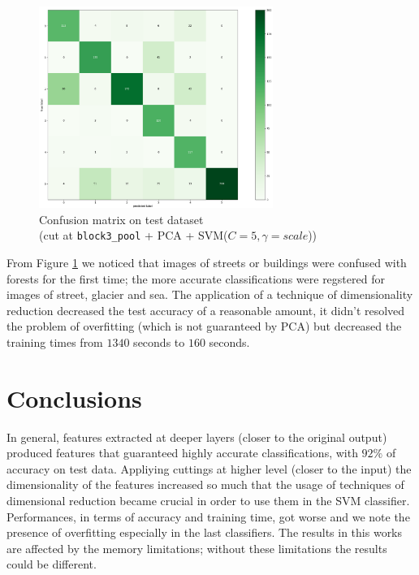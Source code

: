 \documentclass[compsoc]{IEEEtran}
\begin{document}
\begin{figure}[ht!]
\centering                                                                        
\includegraphics[width=3in]{../images/cm3-pca-test.png}
\captionsetup{justification=centering}                                                                                         
\caption{Confusion matrix on test dataset \\ (cut at \texttt{block3\_pool} + PCA + SVM($C=5, \gamma=scale$))}
\label{fig:cm3-pca-test}                                                                                                                               
\end{figure}

From Figure \ref{fig:cm3-pca-test} we noticed that images of streets or buildings were confused with forests for the first time; the more accurate classifications were regstered for images of street, glacier and sea. 
The application of a technique of dimensionality reduction
decreased the test accuracy of a reasonable amount, it didn't resolved the problem of overfitting (which is not guaranteed by PCA) but decreased the training times from $1340$ seconds to $160$ seconds.


\section{Conclusions}
In general, features extracted at deeper layers (closer to the original output) produced features that guaranteed highly accurate classifications, with $92\%$ 
of accuracy on test data. Appliying cuttings at higher level (closer to the input) the dimensionality of the features increased so much that the usage of techniques of  dimensional reduction became crucial in order to use them in the SVM classifier. Performances, in terms of accuracy and training time, got worse and  we note the presence of overfitting especially in the last classifiers. The results in this works are affected by the memory limitations; without these limitations the results could be different.
\end{document}
